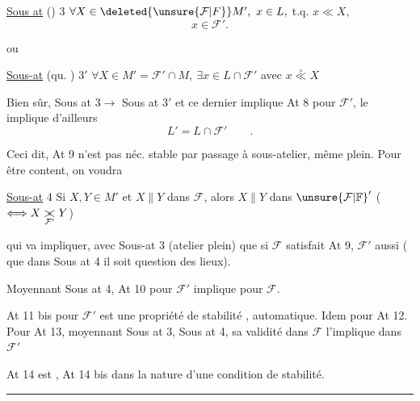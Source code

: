 \uline{Sous at} () 3 $\forall X\in\deleted{\unsure{\mathcal F|F}}M',\ x\in L,$ t.q. $x\ll X,$
\[
x\in\mathcal F'.
\]

 ou


\uline{Sous-at} (qu. ) $3'$ $\forall X\in M'=\mathcal F'\cap M,\ \exists x\in L\cap\mathcal F'$ avec $x\overset{\circ}{\ll} X$

Bien sûr, Sous at $3\to$ Sous at $3'$ et ce dernier implique At 8 pour $\mathcal F'$,  le  implique d'ailleurs
\[
L'=L\cap\mathcal F'\qquad .
\]

Ceci dit, At 9 n'est pas néc. stable par passage à sous-atelier, même plein. Pour être content, on voudra

\uline{Sous-at} 4 Si $X,Y\in M'$ et $X\parallel Y$ dans $\mathcal F$, alors $X\parallel Y$ dans $ {\unsure{\mathcal F|\mathbb F}}'$ ($\Longleftrightarrow X\mathrel{\underset{\mathcal F'}{\mathord{\rlap{$>$}<}}}Y$)

qui va impliquer,  avec Sous-at 3 (atelier plein) que si $\mathcal F$ satisfait At 9, $\mathcal F'$ aussi ( que dans Sous at 4 il soit question des lieux).

Moyennant Sous at 4,   At 10 pour $\mathcal F'$ implique   pour $\mathcal F$.

At 11 bis  pour $\mathcal F'$ est une propriété de stabilité ,  automatique. Idem pour At 12. Pour At 13,  moyennant Sous at 3, Sous at 4, sa validité dans $\mathcal F$ l'implique dans $\mathcal F'$

At 14 est , At 14 bis dans la nature d'une condition de stabilité.

\begin{center}
\rule{1.35em}{0.4pt}
\end{center}

